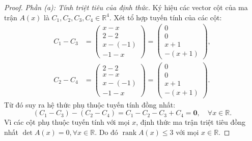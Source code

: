 \documentclass{article}
\begin{document}
\begin{proof}
\emph{Phần (a): Tính triệt tiêu của định thức.}
Ký hiệu các vector cột của ma trận $A(x)$ là $C_1, C_2, C_3, C_4 \in \mathbb{R}^4$. Xét tổ hợp tuyến tính của các cột:
\begin{align}
    C_1 - C_3 &= \begin{pmatrix} x - x \\ 2 - 2 \\ x - (-1) \\ -1 - x \end{pmatrix} = \begin{pmatrix} 0 \\ 0 \\ x + 1 \\ -(x + 1) \end{pmatrix}, \\
    C_2 - C_4 &= \begin{pmatrix} 2 - 2 \\ x - x \\ x - (-1) \\ -1 - x \end{pmatrix} = \begin{pmatrix} 0 \\ 0 \\ x + 1 \\ -(x + 1) \end{pmatrix}.
\end{align}
Từ đó suy ra hệ thức phụ thuộc tuyến tính đồng nhất:
\begin{equation}
    (C_1 - C_3) - (C_2 - C_4) = C_1 - C_2 - C_3 + C_4 = \mathbf{0}, \quad \forall x \in \mathbb{R}.
\end{equation}
Vì các cột phụ thuộc tuyến tính với mọi $x$, định thức ma trận triệt tiêu đồng nhất $\det A(x) = 0, \forall x \in \mathbb{R}$. Do đó $\operatorname{rank} A(x) \le 3$ với mọi $x \in \mathbb{R}$.


\end{proof}
\end{document}

